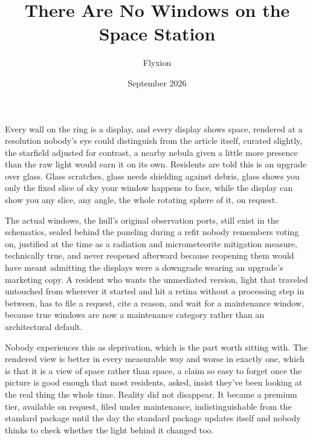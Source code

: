 \documentclass[11pt]{article}
\title{There Are No Windows on the Space Station}
\author{Flyxion}
\date{September 2026}
\begin{document}
\maketitle

Every wall on the ring is a display, and every display shows space, rendered at a resolution nobody's eye could distinguish from the article itself, curated slightly, the starfield adjusted for contrast, a nearby nebula given a little more presence than the raw light would earn it on its own. Residents are told this is an upgrade over glass. Glass scratches, glass needs shielding against debris, glass shows you only the fixed slice of sky your window happens to face, while the display can show you any slice, any angle, the whole rotating sphere of it, on request.

The actual windows, the hull's original observation ports, still exist in the schematics, sealed behind the paneling during a refit nobody remembers voting on, justified at the time as a radiation and micrometeorite mitigation measure, technically true, and never reopened afterward because reopening them would have meant admitting the displays were a downgrade wearing an upgrade's marketing copy. A resident who wants the unmediated version, light that traveled untouched from wherever it started and hit a retina without a processing step in between, has to file a request, cite a reason, and wait for a maintenance window, because true windows are now a maintenance category rather than an architectural default.

Nobody experiences this as deprivation, which is the part worth sitting with. The rendered view is better in every measurable way and worse in exactly one, which is that it is a view of space rather than space, a claim so easy to forget once the picture is good enough that most residents, asked, insist they've been looking at the real thing the whole time. Reality did not disappear. It became a premium tier, available on request, filed under maintenance, indistinguishable from the standard package until the day the standard package updates itself and nobody thinks to check whether the light behind it changed too.
\end{document}
